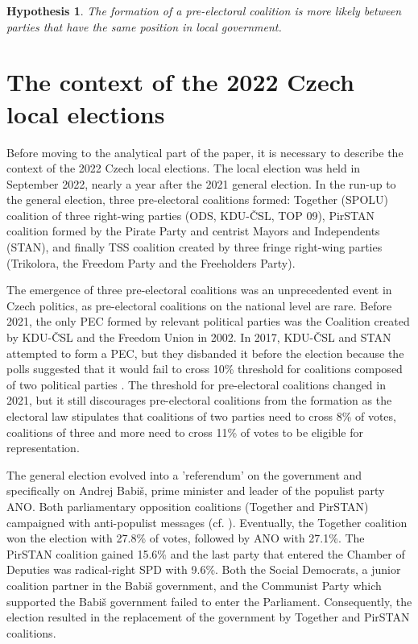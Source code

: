 \documentclass[fignum,12pt,titlepage]{article}
\newtheorem{hypo}{Hypothesis}
\begin{document}
\begin{hypo}
{The formation of a pre-electoral coalition is more likely between parties that have the same position in local government.\label{hyp:4}}
\end{hypo}

\section{The context of the 2022 Czech local elections}

Before moving to the analytical part of the paper, it is necessary to describe the context of the 2022 Czech local elections. The local election was held in September 2022, nearly a year after the 2021 general election. 
In the run-up to the general election, three pre-electoral coalitions formed: Together (SPOLU) coalition of three right-wing parties (ODS, KDU-ČSL, TOP 09), PirSTAN coalition formed by the Pirate Party and centrist Mayors and Independents (STAN), and finally TSS coalition created by three fringe right-wing parties (Trikolora, the Freedom Party and the Freeholders Party). 

The emergence of three pre-electoral coalitions was an unprecedented event in Czech politics, as pre-electoral coalitions on the national level are rare. Before 2021, the only PEC formed by relevant political parties was the Coalition created by KDU-ČSL and the Freedom Union in 2002. In 2017, KDU-ČSL and STAN attempted to form a PEC, but they disbanded it before the election because the polls suggested that it would fail to cross 10\% threshold for coalitions composed of two political parties \parencite{silar2019}. The threshold for pre-electoral coalitions changed in 2021, but it still discourages pre-electoral coalitions from the formation as the electoral law stipulates that coalitions of two parties need to cross 8\% of votes, coalitions of three and more need to cross 11\% of votes to be eligible for representation. 

The general election evolved into a 'referendum' on the government and specifically on Andrej Babiš, prime minister and leader of the populist party ANO. Both parliamentary opposition coalitions (Together and PirSTAN) campaigned with anti-populist messages (cf. \cite{havlik2022,havlik2022b}). Eventually, the Together coalition won the election with 27.8\% of votes, followed by ANO with 27.1\%. The PirSTAN coalition gained 15.6\% and the last party that entered the Chamber of Deputies was radical-right SPD with 9.6\%. Both the Social Democrats, a junior coalition partner in the Babiš government, and the Communist Party which supported the Babiš government failed to enter the Parliament. Consequently, the election resulted in the replacement of the government by Together and PirSTAN coalitions.
\end{document}
